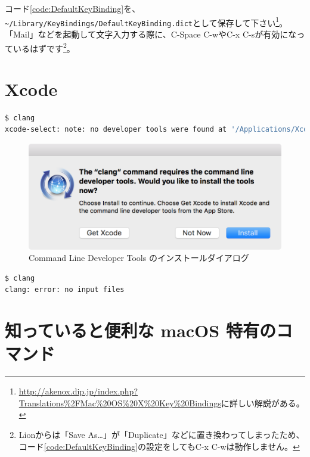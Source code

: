 コード\ref{code:DefaultKeyBinding}を、\texttt{\~{}/Library/KeyBindings/DefaultKeyBinding.dict}として保存して下さい\footnote{\url{http://akenox.dip.jp/index.php?Translations\%2FMac\%20OS\%20X\%20Key\%20Bindings}に詳しい解説がある。}。「Mail」などを起動して文字入力する際に、C-Space C-wやC-x C-sが有効になっているはずです\footnote{Lionからは「Save As\ldots」が「Duplicate」などに置き換わってしまったため、コード\ref{code:DefaultKeyBinding}の設定をしてもC-x C-wは動作しません。}。



\section{Xcode}

\begin{lstlisting}[language=bash]
$ clang
xcode-select: note: no developer tools were found at '/Applications/Xcode.app', requesting install. Choose an option in the dialog to download the command line developer tools.
\end{lstlisting}

\begin{figure}
  \centering
  \includegraphics[scale=0.5]{fig/command-line-developer-tools.png}
  \caption{Command Line Developer Tools のインストールダイアログ}
  \label{fig:command-line-developer-tools}
\end{figure}

\begin{lstlisting}[language=bash]
$ clang
clang: error: no input files
\end{lstlisting}

\section{知っていると便利な macOS 特有のコマンド}

